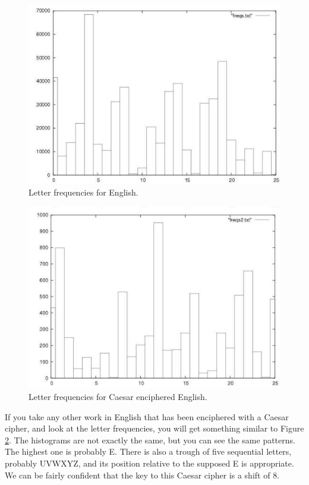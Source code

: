 \documentclass{article}
\begin{document}
\begin{description}
\begin{figure}
  \begin{center}
    \includegraphics[scale=0.5]{freqhist01.png}
  \end{center}
  \caption{Letter frequencies for English.}
  \label{letterfrequencies}
\end{figure}

\begin{figure}
  \begin{center}
    \includegraphics[scale=0.5]{freqhist02.png}
  \end{center}
  \caption{Letter frequencies for Caesar enciphered English.}
  \label{encipheredfrequencies}
\end{figure}

If you take any other work in English that has been enciphered with a
Caesar cipher, and look at the letter frequencies, you will get
something similar to Figure \ref{encipheredfrequencies}.  The
histograms are not exactly the same, but you can see the same
patterns.  The highest one is probably E.  There is also a trough of
five sequential letters, probably UVWXYZ, and its position relative to
the supposed E is appropriate.  We can be fairly confident that the
key to this Caesar cipher is a shift of 8.


\end{description}
\end{document}
